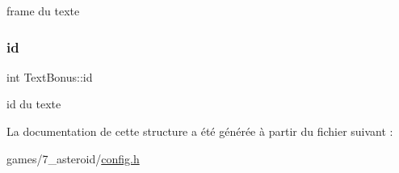 frame du texte 

\mbox{\label{struct_text_bonus_af1f519313a8b671621e464455951dd15}} 
\subsubsection{\texorpdfstring{id}{id}}
{\footnotesize\ttfamily int Text\+Bonus\+::id}



id du texte 



La documentation de cette structure a été générée à partir du fichier suivant \+:\begin{DoxyCompactItemize}
\item 
games/7\+\_\+asteroid/\hyperlink{7__asteroid_2config_8h}{config.\+h}\end{DoxyCompactItemize}
